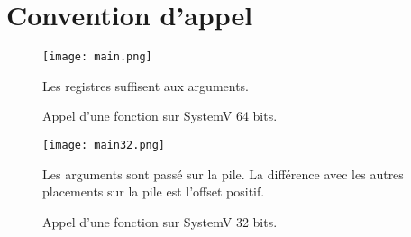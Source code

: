 \section{Convention d'appel}

\begin{figure}[h]
    \centering
    \texttt{[image: main.png]}
    \caption{Appel d'une fonction sur SystemV 64 bits.}
    Les registres suffisent aux arguments.
\end{figure}
\begin{figure}[h]
    \centering
    \texttt{[image: main32.png]}
    \caption{Appel d'une fonction sur SystemV 32 bits.}
    Les arguments sont passé sur la pile. La différence avec les autres placements
sur la pile est l'offset positif.
\end{figure}

